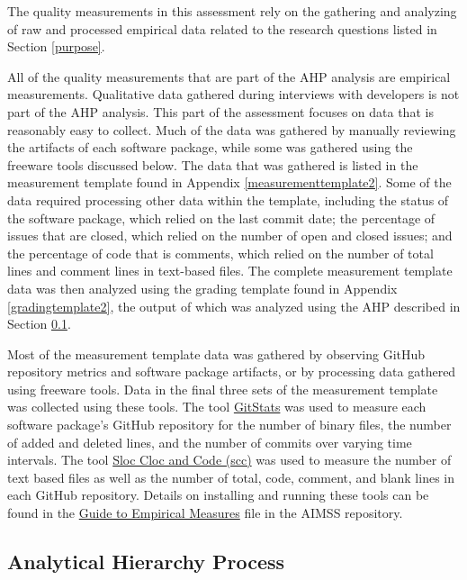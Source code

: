 \documentclass[12pt, notitlepage]{article}
\begin{document}
The quality measurements in this assessment rely on the gathering and analyzing of raw and processed empirical data related to the research questions listed in Section \ref{purpose}. 

All of the quality measurements that are part of the AHP analysis are empirical measurements. Qualitative data gathered during interviews with developers is not part of the AHP analysis. This part of the assessment focuses on data that is reasonably easy to collect. Much of the data was gathered by manually reviewing the artifacts of each software package, while some was gathered using the freeware tools discussed below. The data that was gathered is listed in the measurement template found in Appendix \ref{measurementtemplate2}. Some of the data required processing other data within the template, including the status of the software package, which relied on the last commit date; the percentage of issues that are closed, which relied on the number of open and closed issues; and the percentage of code that is comments, which relied on the number of total lines and comment lines in text-based files. The complete measurement template data was then analyzed using the grading template found in Appendix \ref{gradingtemplate2}, the output of which was analyzed using the AHP described in Section \ref{AHP}.

Most of the measurement template data was gathered by observing GitHub repository metrics and software package artifacts, or by processing data gathered using freeware tools. Data in the final three sets of the measurement template was collected using these tools. The tool \href{https://github.com/tomgi/git_stats}{GitStats} was used to measure each software package's GitHub repository for the number of binary files, the number of added and deleted lines, and the number of commits over varying time intervals. The tool \href{https://github.com/boyter/scc}{Sloc Cloc and Code (scc)} was used to measure the number of text based files as well as the number of total, code, comment, and blank lines in each GitHub repository. Details on installing and running these tools can be found in the \href{https://github.com/smiths/AIMSS/blob/master/StateOfPractice/Methodology/A
	Guide to Empirical Measures.pdf} {Guide to Empirical Measures} file in the AIMSS repository. 

\subsection{Analytical Hierarchy Process}\label{AHP}
\end{document}
